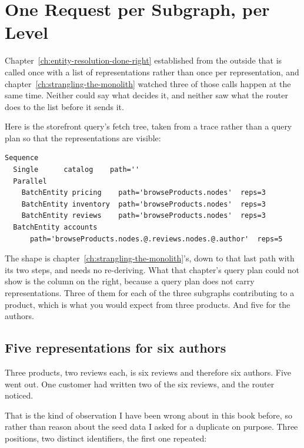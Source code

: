 \section{One Request per Subgraph, per Level}
\label{sec:ch17-one-request-per-subgraph}
%

Chapter~\ref{ch:entity-resolution-done-right} established from the outside that
 is called once with a list of representations rather than once
per representation, and chapter~\ref{ch:strangling-the-monolith} watched three
of those calls happen at the same time. Neither could say what decides it, and
neither saw what the router does to the list before it sends it.

Here is the storefront query's fetch tree, taken from a trace rather than a
query plan so that the representations are visible:

\begin{verbatim}
Sequence
  Single      catalog    path=''
  Parallel
    BatchEntity pricing    path='browseProducts.nodes'  reps=3
    BatchEntity inventory  path='browseProducts.nodes'  reps=3
    BatchEntity reviews    path='browseProducts.nodes'  reps=3
  BatchEntity accounts
      path='browseProducts.nodes.@.reviews.nodes.@.author'  reps=5
\end{verbatim}

The shape is chapter~\ref{ch:strangling-the-monolith}'s, down to that last path
with its two  steps, and needs no re-deriving. What that chapter's query
plan could not show is the column on the right, because a query plan does not
carry representations. Three of them for each of the three subgraphs
contributing to a product, which is what you would expect from three products.
And five for the authors.

\subsection*{Five representations for six authors}

%
Three products, two reviews each, is six reviews and therefore six authors. Five
went out. One customer had written two of the six reviews, and the router
noticed.

That is the kind of observation I have been wrong about in this book before, so
rather than reason about the seed data I asked for a duplicate on purpose. Three
positions, two distinct identifiers, the first one repeated:

